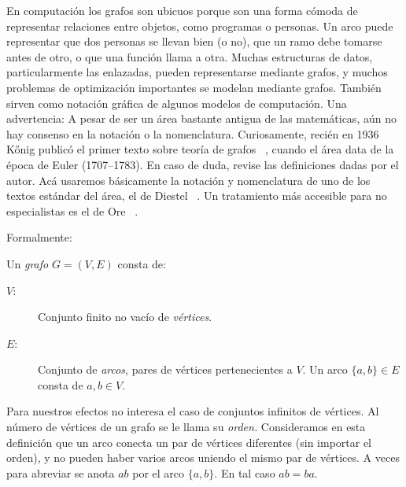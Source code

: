  En computación los grafos son ubicuos
  porque son una forma cómoda
  de representar relaciones entre objetos,
  como programas o personas.
  Un arco puede representar que dos personas se llevan bien
  (o no),
  que un ramo debe tomarse antes de otro,
  o que una función llama a otra.
  Muchas estructuras de datos,
  particularmente las enlazadas,
  pueden representarse mediante grafos,
  y muchos problemas de optimización importantes
  se modelan mediante grafos.
  También sirven como notación gráfica
  de algunos modelos de computación.
  Una advertencia:
  A pesar de ser un área bastante antigua de las matemáticas,
  aún no hay consenso en la notación o la nomenclatura.
  Curiosamente,
  recién en 1936 Kőnig
  publicó el primer texto sobre teoría de grafos~%
    \cite{koenig36:_theor_graph},
  cuando el área data de la época de Euler (1707\nobreakdash--1783).%
  En caso de duda,
  revise las definiciones dadas por el autor.
  Acá usaremos básicamente la notación y nomenclatura
  de uno de los textos estándar del área,
  el de Diestel~%
    \cite{diestel10:_graph_theor}.
  Un tratamiento más accesible para no especialistas es el de Ore~%
    \cite{ore90:_graph_uses}.

  Formalmente:
  \begin{definition}
    Un \emph{grafo} \(G = (V, E)\) consta de:
    \begin{center}
      \begin{description}
	\item[\boldmath \(V\):\unboldmath]
	  Conjunto finito no vacío de \emph{vértices}.%
	\item[\boldmath \(E\):\unboldmath]
	  Conjunto de \emph{arcos},%
	  pares de vértices pertenecientes a \(V\).
	  Un arco \(\{a, b\} \in E\)
	  consta de \(a, b \in V\).
      \end{description}
    \end{center}
  \end{definition}
  Para nuestros efectos no interesa
  el caso de conjuntos infinitos de vértices.
  Al número de vértices de un grafo se le llama su \emph{orden.}%
  Consideramos en esta definición que un arco
  conecta un par de vértices diferentes
  (sin importar el orden),
  y no pueden haber varios arcos uniendo el mismo par de vértices.
  A veces para abreviar se anota \(a b\) por el arco \(\{a, b\}\).
  En tal caso \(a b = b a\).

